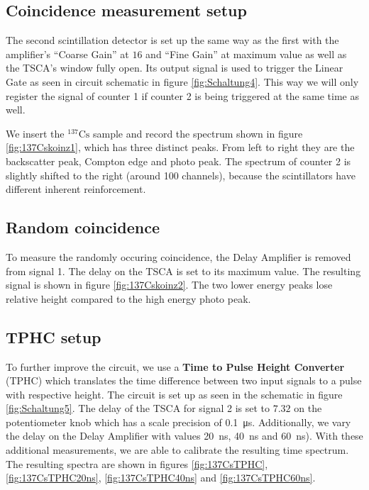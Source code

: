 \subsection*{Coincidence measurement setup}
%
The second scintillation detector is set up the same way as the first with the amplifier's \enquote{Coarse Gain} at $16$ and \enquote{Fine Gain} at maximum value as well as the TSCA's window fully open.
Its output signal is used to trigger the Linear Gate as seen in circuit schematic in figure \ref{fig:Schaltung4}.
This way we will only register the signal of counter 1 if counter 2 is being triggered at the same time as well.
%
\par
%
We insert the $^{137}\text{Cs}$ sample and record the spectrum shown in figure \ref{fig:137Cskoinz1}, which has three distinct peaks.
From left to right they are the backscatter peak, Compton edge and photo peak.
The spectrum of counter 2 is slightly shifted to the right (around 100 channels), because the scintillators have different inherent reinforcement.
%
\subsection*{Random coincidence}
%
To measure the randomly occuring coincidence, the Delay Amplifier is removed from signal 1.
The delay on the TSCA is set to its maximum value.
The resulting signal is shown in figure \ref{fig:137Cskoinz2}.
The two lower energy peaks lose relative height compared to the high energy photo peak.
%
\subsection*{TPHC setup}
%
To further improve the circuit, we use a \textbf{Time to Pulse Height Converter} (TPHC) which translates the time difference between two input signals to a pulse with respective height.
The circuit is set up as seen in the schematic in figure \ref{fig:Schaltung5}.
The delay of the TSCA for signal 2 is set to $7.32$ on the potentiometer knob which has a scale precision of \SI{0.1}{\micro\second}.
Additionally, we vary the delay on the Delay Amplifier with values \SI{20}{\nano\second}, \SI{40}{\nano\second} and \SI{60}{\nano\second}).
With these additional measurements, we are able to calibrate the resulting time spectrum.
The resulting spectra are shown in figures \ref{fig:137CsTPHC}, \ref{fig:137CsTPHC20ns}, \ref{fig:137CsTPHC40ns} and \ref{fig:137CsTPHC60ns}.
%
